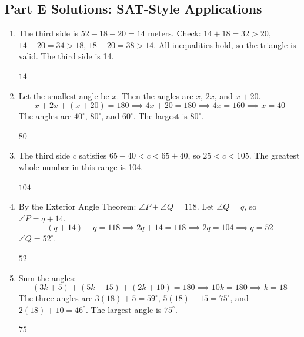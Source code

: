 \documentclass[14pt]{extarticle}
\begin{document}
\subsection*{Part E Solutions: SAT-Style Applications}
\begin{enumerate}
  \item The third side is \(52 - 18 - 20 = 14\) meters. Check: \(14 + 18 = 32 > 20\), \(14 + 20 = 34 > 18\), \(18 + 20 = 38 > 14\). All inequalities hold, so the triangle is valid. The third side is 14.

  \(\boxed{14}\)

  \item Let the smallest angle be \(x\). Then the angles are \(x\), \(2x\), and \(x + 20\).
  \[
  x + 2x + (x + 20) = 180 \implies 4x + 20 = 180 \implies 4x = 160 \implies x = 40
  \]
  The angles are \(40^\circ\), \(80^\circ\), and \(60^\circ\). The largest is \(80^\circ\).

  \(\boxed{80}\)

  \item The third side \(c\) satisfies \(65 - 40 < c < 65 + 40\), so \(25 < c < 105\). The greatest whole number in this range is 104.

  \(\boxed{104}\)

  \item By the Exterior Angle Theorem: \(\angle P + \angle Q = 118\). Let \(\angle Q = q\), so \(\angle P = q + 14\).
  \[
  (q + 14) + q = 118 \implies 2q + 14 = 118 \implies 2q = 104 \implies q = 52
  \]
  \(\angle Q = 52^\circ\).

  \(\boxed{52}\)

  \item Sum the angles:
  \[
  (3k + 5) + (5k - 15) + (2k + 10) = 180 \implies 10k = 180 \implies k = 18
  \]
  The three angles are \(3(18) + 5 = 59^\circ\), \(5(18) - 15 = 75^\circ\), and \(2(18) + 10 = 46^\circ\). The largest angle is \(75^\circ\).

  \(\boxed{75}\)
\end{enumerate}

\end{document}
